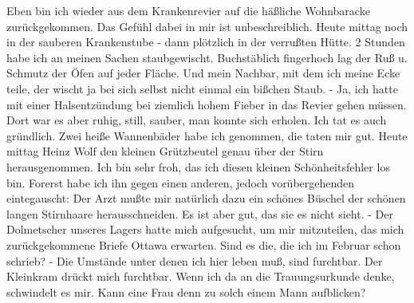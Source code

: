 \def\day{15. Februar 1944.}
\mktitle

Eben bin ich wieder aus dem Krankenrevier auf die h\"{a}{\ss}liche Wohnbaracke zur\"{u}ckgekommen.
Das Gef\"{u}hl dabei in mir ist unbeschreiblich.
Heute mittag noch in der sauberen Krankenstube - dann pl\"{o}tzlich in der verru{\ss}ten H\"{u}tte.
2 Stunden habe ich an meinen Sachen staubgewischt.
Buchst\"{a}blich fingerhoch lag der Ru{\ss} u. Schmutz der \"{O}fen auf jeder Fl\"{a}che.
Und mein Nachbar, mit dem ich meine Ecke teile, der wischt ja bei sich selbst nicht einmal ein bi{\ss}chen Staub.
- Ja, ich hatte mit einer Halsentz\"{u}ndung bei ziemlich hohem Fieber in das Revier gehen m\"{u}ssen.
Dort war es aber ruhig, still, sauber, man konnte sich erholen.
Ich tat es auch gr\"{u}ndlich.
Zwei hei{\ss}e Wannenb\"{a}der habe ich genommen, die taten mir gut.
Heute mittag Heinz Wolf den kleinen Gr\"{u}tzbeutel genau \"{u}ber der Stirn herausgenommen.
Ich bin sehr froh, das ich diesen kleinen Sch\"{o}nheitsfehler los bin.
Forerst habe ich ihn gegen einen anderen, jedoch vor\"{u}bergehenden eintegauscht: Der Arzt mu{\ss}te mir nat\"{u}rlich dazu ein sch\"{o}nes B\"{u}schel der sch\"{o}nen langen Stirnhaare herausschneiden.
Es ist aber gut, das sie es nicht sieht.
- Der Dolmetscher unseres Lagers hatte mich aufgesucht, um mir mitzuteilen, das mich zur\"{u}ckgekommene Briefe Ottawa erwarten.
Sind es die, die ich im Februar schon schrieb?
- Die Umst\"{a}nde unter denen ich hier leben mu{\ss}, sind furchtbar.
Der Kleinkram dr\"{u}ckt mich furchtbar.
Wenn ich da an die Trauungsurkunde denke, schwindelt es mir.
Kann eine Frau denn zu solch einem Mann aufblicken?

\clearpage
